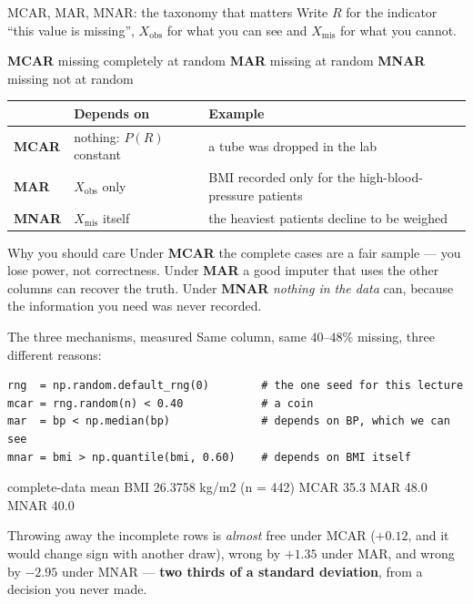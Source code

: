 \documentclass[aspectratio=169]{beamer}
\begin{document}
\begin{frame}[shrink=6]{MCAR, MAR, MNAR: the taxonomy that matters}
  Write $R$ for the indicator ``this value is missing'', $X_{\text{obs}}$ for
  what you can see and $X_{\text{mis}}$ for what you cannot.
  \begin{center}\footnotesize
    \textbf{MCAR} missing completely at random \quad
    \textbf{MAR} missing at random \quad
    \textbf{MNAR} missing not at random
  \end{center}
  \begin{center}\small
  \begin{tabular}{@{}llp{5.2cm}@{}}
    \toprule
    & \textbf{Depends on} & \textbf{Example}\\
    \midrule
    \textbf{MCAR} & nothing:
      $P(R) $ constant & a tube was dropped in the lab\\[3pt]
    \textbf{MAR}  & $X_{\text{obs}}$ only &
      BMI recorded only for the high-blood-pressure patients\\[3pt]
    \textbf{MNAR} & $X_{\text{mis}}$ itself &
      the heaviest patients decline to be weighed\\
    \bottomrule
  \end{tabular}
  \end{center}
  \vspace{0.3em}
  \begin{exampleblock}{Why you should care}
    \small Under \textbf{MCAR} the complete cases are a fair sample --- you
    lose power, not correctness. Under \textbf{MAR} a good imputer that uses
    the other columns can recover the truth. Under \textbf{MNAR} \emph{nothing
    in the data} can, because the information you need was never recorded.
  \end{exampleblock}
\end{frame}

\begin{frame}[fragile,shrink=4]{The three mechanisms, measured}
Same column, same $40$--$48\%$ missing, three different reasons:
\begin{lstlisting}
rng  = np.random.default_rng(0)        # the one seed for this lecture
mcar = rng.random(n) < 0.40            # a coin
mar  = bp < np.median(bp)              # depends on BP, which we can see
mnar = bmi > np.quantile(bmi, 0.60)    # depends on BMI itself
\end{lstlisting}
\begin{outblk}
complete-data mean BMI  26.3758 kg/m2   (n = 442)
  MCAR  35.3%
  MAR   48.0%
  MNAR  40.0%
\end{outblk}
\begin{center}\small
  Throwing away the incomplete rows is \emph{almost} free under MCAR
  ($+0.12$, and it would change sign with another draw), wrong by $+1.35$
  under MAR, and wrong by $-2.95$ under MNAR --- \textbf{two thirds of a
  standard deviation}, from a decision you never made.
\end{center}
\end{frame}
\end{document}
